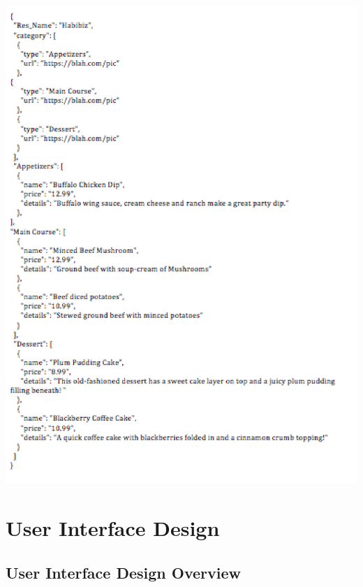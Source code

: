 \documentclass[12pt, titlepage]{article}
\begin{document}
\includegraphics[width=150mm,scale=0.5]{JSONdata.png}


\section{User Interface Design}

\subsection{User Interface Design Overview}
\end{document}
